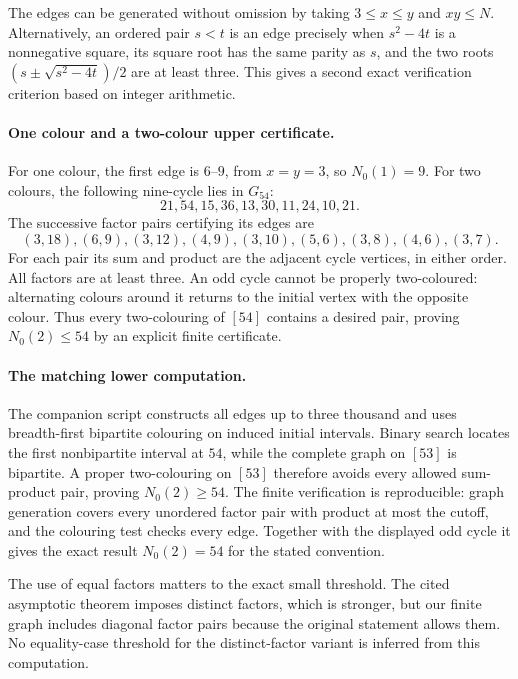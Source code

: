 \documentclass[11pt,a4paper]{article}
\begin{document}
The edges can be generated without omission by taking $3\leq x\leq y$ and $xy\leq N$. Alternatively, an ordered pair $s<t$ is an edge precisely when $s^2-4t$ is a nonnegative square, its square root has the same parity as $s$, and the two roots $(s\pm\sqrt{s^2-4t})/2$ are at least three. This gives a second exact verification criterion based on integer arithmetic.

\paragraph{One colour and a two-colour upper certificate.}
For one colour, the first edge is $6$--$9$, from $x=y=3$, so $N_0(1)=9$. For two colours, the following nine-cycle lies in $G_{54}$:
\[
 21,54,15,36,13,30,11,24,10,21.
\]
The successive factor pairs certifying its edges are
\[
 (3,18),(6,9),(3,12),(4,9),(3,10),
 (5,6),(3,8),(4,6),(3,7).
\]
For each pair its sum and product are the adjacent cycle vertices, in either order. All factors are at least three. An odd cycle cannot be properly two-coloured: alternating colours around it returns to the initial vertex with the opposite colour. Thus every two-colouring of $[54]$ contains a desired pair, proving $N_0(2)\leq54$ by an explicit finite certificate.

\paragraph{The matching lower computation.}
The companion script constructs all edges up to three thousand and uses breadth-first bipartite colouring on induced initial intervals. Binary search locates the first nonbipartite interval at $54$, while the complete graph on $[53]$ is bipartite. A proper two-colouring on $[53]$ therefore avoids every allowed sum-product pair, proving $N_0(2)\geq54$. The finite verification is reproducible: graph generation covers every unordered factor pair with product at most the cutoff, and the colouring test checks every edge. Together with the displayed odd cycle it gives the exact result $N_0(2)=54$ for the stated convention.

The use of equal factors matters to the exact small threshold. The cited asymptotic theorem imposes distinct factors, which is stronger, but our finite graph includes diagonal factor pairs because the original statement allows them. No equality-case threshold for the distinct-factor variant is inferred from this computation.
\end{document}
